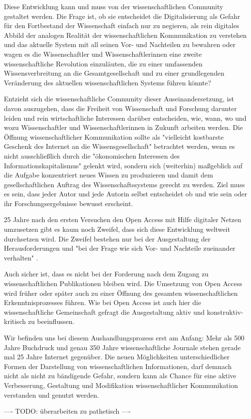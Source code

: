 Diese Entwicklung kann und muss von der wissenschaftlichen Community gestaltet werden. Die Frage ist, ob sie entscheidet die Digitalisierung als Gefahr für den Fortbestand der Wissenschaft einfach nur zu negieren, als rein digitales Abbild der analogen Realität der wissenschaftlichen Kommunikation zu verstehen und das aktuelle System mit all seinen Vor- und Nachteilen zu bewahren oder wagen es die Wissenschaftler und Wissenschaftlerinnen eine zweite wissenschaftliche Revolution einzuläuten, die zu einer umfassenden Wissensverbreitung an die Gesamtgesellschaft und zu einer grundlegenden Veränderung des aktuellen wissenschaftlichen Systems führen könnte?

Entzieht sich die wissenschaftliche Community dieser Auseinandersetzung, ist davon auszugehen, dass die Freiheit von Wissenschaft und Forschung darunter leiden und rein wirtschaftliche Interessen darüber entscheiden, wie, wann, wo und wozu Wissenschaftler und Wissenschaftlerinnen in Zukunft arbeiten werden. Die Öffnung wissenschaftlicher Kommunikation sollte als "vielleicht kostbarste Geschenk des Internet an die Wissensgesellschaft" betrachtet werden, wenn es nicht ausschließlich durch die "ökonomischen Interessen des Informationskapitalismus" \cite{hagner_2015_sache_buches} gelenkt wird, sondern sich (weiterhin) maßgeblich auf die Aufgabe konzentriert neues Wissen zu produzieren und damit dem gesellschaftlichen Auftrag des Wissenschaftssystems gerecht zu werden. Ziel muss es sein, dass jeder Autor und jede Autorin selbst entscheidet ob und wie sein oder ihr Forschungsergebnisse bewusst erscheint.

25 Jahre nach den ersten Versuchen den Open Access mit Hilfe digitaler Netzen umzusetzen gibt es kaum noch Zweifel, dass sich diese Entwicklung weltweit durchsetzen wird. Die Zweifel bestehen nur bei der Ausgestaltung der Herausforderungen und "bei der Frage wie sich Vor- und Nachteile zueinander verhalten"  \cite{hagner_2015_sache_buches}.

Auch sicher ist, dass es nicht bei der Forderung nach dem Zugang zu wissenschaftlichen Publikationen bleiben wird. Die Umsetzung von Open Access wird früher oder später auch zu einer Öffnung des gesamten wissenschaftlichen Erkenntnisprozesses führen. Wie bei Open Access ist auch hier die wissenschaftliche Gemeinschaft gefragt die Ausgestaltung aktiv und konstruktiv-kritisch zu beeinflussen.

Wir befinden uns bei diesem Aushandlungsprozess erst am Anfang: Mehr als 500 Jahre Buchdruck und genau 350 Jahre wissenschaftliche Journale stehen gerade mal 25 Jahre Internet gegenüber. Die neuen Möglichkeiten unterschiedlicher Formen der Darstellung von wissenschaftlichen Informationen, darf demnach nicht als nicht zu bändigende Gefahr, sondern kann als Chance für eine aktive Verbesserung, Gestaltung und Modifikation wissenschaftlicher Kommunikation verstanden und genutzt werden.

---- TODO: überarbeiten zu pathetisch ----
